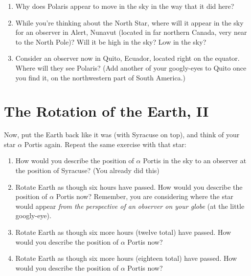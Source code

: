\documentclass[12pt]{article}
\begin{document}
\begin{enumerate}
\vspace{1in}

\item Why does Polaris appear to move in the sky in the way that it did here?

\vspace{1in}

\item While you're thinking about the North Star, where will it appear in the sky for an observer in Alert, Nunavut (located in
far northern Canada, very near to the North Pole)? Will it be high in the sky? Low in the sky?

\vspace{1in}

\item Consider an observer now in Quito, Ecuador, located right on the equator. Where will they see Polaris? (Add another 
of your googly-eyes to Quito once you find it, on the northwestern part of South America.)

\vspace{1in}

\end{enumerate}

\section{The Rotation of the Earth, II}

 Now, put the Earth back like it was (with Syracuse on top), and think of your star $\alpha$ Portis again. Repeat the same
exercise with that star:

\begin{enumerate}

\item How would you describe the position of $\alpha$ Portis in the sky to an observer at the position of Syracuse? (You already did this)

\vspace{1in}

\item Rotate Earth as though six hours have passed. How would you describe the position of $\alpha$ Portis now? Remember, you 
are considering where the star would appear {\it from the perspective of an observer on your globe} (at the little googly-eye).
\vspace{1in}
\item Rotate Earth as though six more hours (twelve total) have passed. How would you describe the position of $\alpha$ Portis now?
\vspace{1in}
\item Rotate Earth as though six more hours (eighteen total)  have passed. How would you describe the position of $\alpha$ Portis now?
\vspace{1in}

\end{enumerate}
\end{document}
